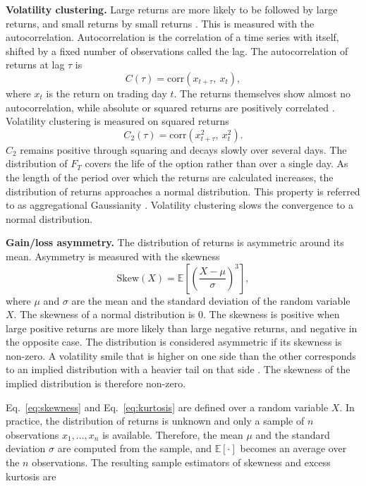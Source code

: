 \textbf{Volatility clustering.} Large returns are more likely to be followed by large returns, and small returns by small returns \parencite{contEmpiricalPropertiesAsset2001}. This is measured with the autocorrelation. Autocorrelation is the correlation of a time series with itself, shifted by a fixed number
of observations called the lag. The autocorrelation of returns at lag $\tau$ is 
\begin{equation}
    C(\tau) = \mathrm{corr}\!\left( x_{t+\tau},\ x_{t} \right),
    \label{eq:autocorrelation}
\end{equation}
where $x_t$ is the return on trading day $t$. The returns themselves show almost no autocorrelation, while absolute or squared returns are positively correlated \parencite{contEmpiricalPropertiesAsset2001}. Volatility clustering is measured on squared returns
\begin{equation}
    C_2(\tau) = \mathrm{corr}\!\left( x_{t+\tau}^{2},\ x_{t}^{2} \right).
    \label{eq:vol-clustering}
\end{equation}
$C_2$ remains positive through squaring and decays slowly over several days. The distribution of $F_T$ covers the life of the option rather than over a single day. As the length of the period over which the returns are calculated increases, the distribution of returns approaches a normal distribution. This property is referred to as aggregational Gaussianity \parencite{contEmpiricalPropertiesAsset2001}. Volatility clustering slows the convergence to a normal distribution.

\textbf{Gain/loss asymmetry.} The distribution of returns is asymmetric around its mean. Asymmetry is measured with the skewness
\begin{equation}
    \mathrm{Skew}(X) = \mathbb{E}\!\left[\left(\frac{X-\mu}{\sigma}\right)^{3}\right],
    \label{eq:skewness}
\end{equation}
where $\mu$ and $\sigma$ are the mean and the standard deviation of the random variable $X$. The skewness of a normal distribution is 0. The skewness is positive when large positive returns are more likely than large negative returns, and negative in the opposite case. The distribution is considered asymmetric if its skewness is non-zero. 
A volatility smile that is higher on one side than the other corresponds to an implied distribution with a heavier tail on that side \parencite[456]{hullOptionsFuturesOther2022}. The skewness of the implied distribution is therefore non-zero.

Eq.~\eqref{eq:skewness} and Eq.~\eqref{eq:kurtosis} are defined over a random variable $X$. In practice, the distribution of returns is unknown and only a sample of $n$ observations $x_1, \dots, x_n$ is available. Therefore, the mean $\mu$ and the standard deviation $\sigma$ are computed from the sample, and $\mathbb{E}[\cdot]$ becomes an average over the $n$ observations. The resulting sample estimators of skewness and excess kurtosis are 

